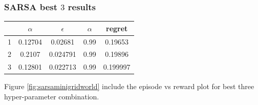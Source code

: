\documentclass[11pt, a4]{article}
\begin{document}
			\subsubsection{SARSA best $3$ results}
				\begin{center}
					\begin{tabular}{|c|c|c|c|c|}
						\hline
						& $\alpha$ & $\epsilon$ &$\alpha$& regret\\
						\hline
						1 & 0.12704 & 0.02681 & 0.99 & 0.19653\\
						\hline
						2 & 0.2107 & 0.024791 & 0.99 & 0.19896\\
						\hline
						3 & 0.12801 & 0.022713 & 0.99 & 0.199997\\
						\hline
					\end{tabular}
				\end{center}
				Figure \ref{fig:sarsaminigridworld} include the episode vs reward plot for best three hyper-parameter combination.
\end{document}
